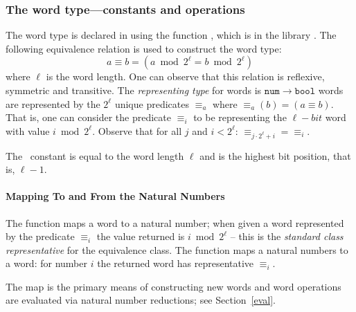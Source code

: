 {%


\subsubsection{The word type---constants and operations} \label{type}

The word type is declared in \HOL{} using the function
, which is in the library
.  The following equivalence relation is used to
construct the word type:
\[ a \equiv b = (a \bmod 2^\ell = b \bmod 2^\ell) \]
where $\ell$ is the word length.  One can observe that this relation
is reflexive, symmetric and transitive.  The \emph{representing type}
for words is $\mathtt{num}\rightarrow\mathtt{bool}$ \ie{} words are
represented by the $2^\ell$ unique predicates ${\equiv_a}$ where
${\equiv_a}(b) = (a \equiv b)$.  That is, one can consider the
predicate ${\equiv_i}$ to be representing the $\ell-bit$ word with
value $i \bmod 2^\ell$.  Observe that for all $j$ and $i < 2^\ell$:
${\equiv_{j\cdot 2^\ell + i}} = {\equiv_i}$.

The \HOL\ constant  is equal to the word length $\ell$ and
 is the highest bit position, that is, $\ell - 1$.

\paragraph{Mapping To and From the Natural Numbers}

The function  maps a word to a natural number; when given a
word represented by the predicate ${\equiv_i}$ the value returned is
$i \bmod 2^\ell$ -- this is the \emph{standard class representative}
for the equivalence class.  The function  maps a natural
numbers to a word: for number $i$ the returned word has representative
${\equiv_i}$.

The map  is the primary means of constructing new words and
word operations are evaluated via natural number reductions; see
Section~\ref{eval}.

}
